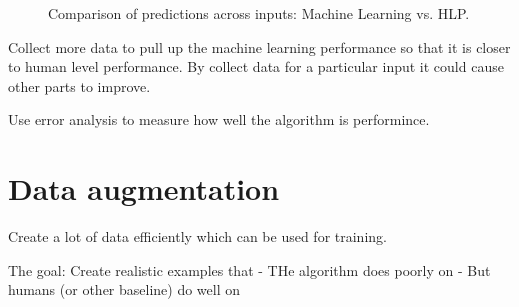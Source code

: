 \begin{figure}[h!]
    \centering
    \caption{Comparison of predictions across inputs: Machine Learning vs. HLP.}
    \label{fig:predictions-curve}
\end{figure}

Collect more data to pull up the machine learning performance so that it is closer to human level performance.
By collect data for a particular input it could cause other parts to improve.

Use error analysis to measure how well the algorithm is performince.

\section{Data augmentation}

Create a lot of data efficiently which can be used for training.

The goal: Create realistic examples that
- THe algorithm does poorly on
- But humans (or other baseline) do well on

